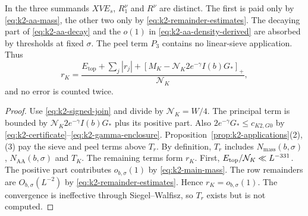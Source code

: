 \begin{remark}
In \cite[Theorem~2.6, (2.30)]{PaperI} the three summands
\(XV E_s\), \(R_1^{\nu}\) and \(R^{\nu}\) are distinct. The first is
paid only by \eqref{eq:k2-aa-mass}, the other two only by
\eqref{eq:k2-remainder-estimates}. The decaying part of
\eqref{eq:k2-aa-decay} and the \(o(1)\) in
\eqref{eq:k2-aa-density-derived} are absorbed by thresholds at fixed
\(\sigma\). The peel term \(P_3\) contains no linear-sieve
application. Thus
\[
 r_K=\frac{E_{\mathrm{top}}+\sum_j|r_j|
       +[M_K-\mathcal N_K2e^{-\gamma}I(b)G_*]_+}{\mathcal N_K},
\]
and no error is counted twice.
\end{remark}

\begin{proof}
Use \eqref{eq:k2-signed-join} and divide by \(\mathcal N_K=W/4\). The
principal term is bounded by \(\mathcal N_K2e^{-\gamma}I(b)G_*\) plus its
positive part. Also \(2e^{-\gamma}G_*\le c_{K2,G0}\) by
\eqref{eq:k2-certificate}--\eqref{eq:k2-gamma-enclosure}.
Proposition~\ref{prop:k2-applications}(2),(3) pay the sieve and peel terms
above \(T_r\). By definition, \(T_r\) includes
\(N_{\mathrm{mass}}(b,\sigma)\), \(N_{\mathrm{AA}}(b,\sigma)\) and
\(T_K\). The remaining terms form \(r_K\). First,
\(E_{\rm top}/\mathcal N_K\ll L^{-331}\). The positive part contributes
\(o_{b,\sigma}(1)\) by \eqref{eq:k2-main-mass}. The row remainders are
\(O_{b,\sigma}(L^{-2})\) by \eqref{eq:k2-remainder-estimates}. Hence
\(r_K=o_{b,\sigma}(1)\).
The convergence is ineffective through Siegel--Walfisz, so \(T_r\)
exists but is not computed.
\end{proof}
